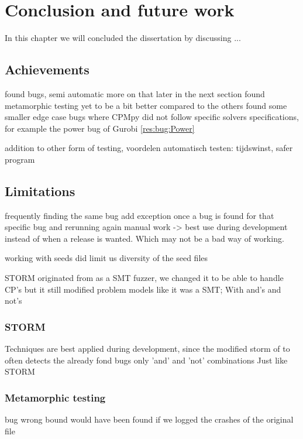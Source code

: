 \chapter{Conclusion and future work}
\label{cha:conclusion}
\label{con:intro}
In this chapter we will concluded the dissertation by discussing ...

\section{Achievements}
\label{con:Achievements}
found bugs, 
semi automatic more on that later in the next section 
found metamorphic testing yet to be a bit better compared to the others
found some smaller edge case bugs where CPMpy did not follow specific solvers specifications, for example the power bug of Gurobi \ref{res:bug:Power}


addition to other form of testing, 
voordelen automatisch testen: tijdswinst, safer program

\section{Limitations}
\label{con:Limitations}
frequently finding the same bug
add exception once a bug is found for that specific bug and rerunning again manual work
-> best use during development instead of when a release is wanted. 
Which may not be a bad way of working.

working with seeds did limit us
diversity of the seed files  



STORM originated from as a SMT fuzzer, we changed it to be able to handle CP's 
but it still modified problem models like it was a SMT; With and's and not's

\subsection{STORM}
Techniques are best applied during development, since the modified storm of to often detects the already fond bugs
only 'and' and 'not' combinations Just like STORM



\subsection{Metamorphic testing}
bug wrong bound would have been found if we logged the crashes of the original file 

